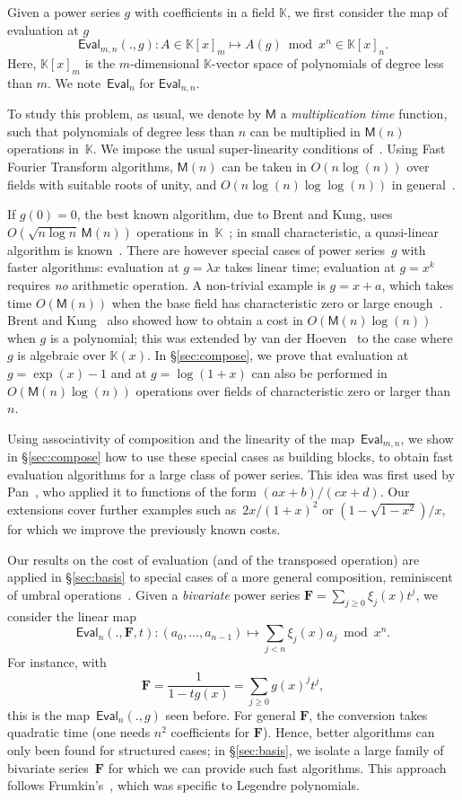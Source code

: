 \documentclass{sig-alternate}
\def\F {\ensuremath{\mathbf{F}}}
\def\K {\ensuremath{\mathbb{K}}}
\def\M{\ensuremath{\mathsf{M}}}
\def\Eval {\ensuremath{\mathsf{Eval}}}
\begin{document}
\smallskip{} Given a power series $g$ with
coefficients in a field $\K$, we first consider the map of
evaluation at $g$
$$\Eval_{m,n}(.,g): A \in \K[x]_m \mapsto A(g) \bmod x^n \in \K[x]_n.$$
Here, $\K[x]_m$ is the $m$-dimensional $\K$-vector space of
polynomials of degree less than $m$. We note~$\Eval_n$ for 
$\Eval_{n,n}$.

To study this problem, as usual, we denote by $\M$ a
\emph{multiplication time} function, such that polynomials of degree
less than $n$ can be multiplied in $\M(n)$ operations in~$\K$. We
impose the usual super-linearity conditions
of~\cite[Chap.~8]{GaGe99}. Using Fast Fourier Transform algorithms,
$\M(n)$ can be taken in $O(n \log(n))$ over fields with suitable roots
of unity, and $O(n \log(n)\log\log(n))$ in
general~\cite{ScSt71,CaKa91}.

If $g(0)=0$, the best known algorithm, due to Brent and Kung,
uses~$O(\sqrt{n\log n} \, \M(n))$ operations in~$\K$~\cite{BrKu78}; in
small characteristic, a quasi-linear algorithm is
known~\cite{Bernstein98b}. There are however special cases of power
series~$g$ with faster algorithms: evaluation at $g=\lambda x$ takes
linear time; evaluation at $g=x^k$ requires \emph{no} arithmetic
operation. A non-trivial example is $g=x+a$, which takes time
$O(\M(n))$ when the base field has characteristic zero or large
enough~\cite{AhStUl75}. Brent and Kung~\cite{BrKu78} also showed how
to obtain a cost in $O(\M(n)\log(n))$ when $g$ is a polynomial; this
was extended by van der Hoeven~\cite{Hoeven02} to the case where $g$
is algebraic over $\K(x)$. In \S\ref{sec:compose}, we prove that
evaluation at $g=\exp(x)-1$ and at $g=\log(1+x)$ can also be performed
in $O(\M(n) \log(n))$ operations over fields of characteristic zero or
larger than~$n$.

Using associativity of composition and the linearity of the
map~$\Eval_{m,n}$, we show in \S\ref{sec:compose} how to use these
special cases as building blocks, to obtain fast evaluation algorithms
for a large class of power series.  This idea was first used by
Pan~\cite{Pan98}, who applied it to functions of the form
$(ax+b)/(cx+d)$. Our extensions cover further examples
such as~$2x/(1+x)^2$ or $(1-\sqrt{1-x^2})/x$, for which we improve 
the previously known costs.

\smallskip{}  Our results on the cost
of evaluation (and of the transposed operation) are applied in
\S\ref{sec:basis} to special cases of a more general composition,
reminiscent of umbral operations~\cite{Roman05}. Given a
\emph{bivariate} power series $\F=\sum_{j\ge0}\xi_j(x)t^j$, we
consider the linear map
\[\Eval_n(.,\F,t):  (a_0,\dots,a_{n-1})  \mapsto  \sum_{j < n}\xi_j(x) a_j \bmod x^n.\]
For instance, with $$\F= \frac1{1-tg(x)}=\sum_{j\ge 0} g(x)^jt^j,$$
this is the map~$\Eval_n(.,g)$ seen before.  For general $\F$, the
conversion takes quadratic time (one needs $n^2$ coefficients for
$\F$). Hence, better algorithms can only been found for structured
cases; in \S\ref{sec:basis}, we isolate a large family of bivariate
series~$\F$ for which we can provide such fast algorithms.
This approach follows Frumkin's~\cite{Frumkin95}, which was specific
to Legendre polynomials.
\end{document}
